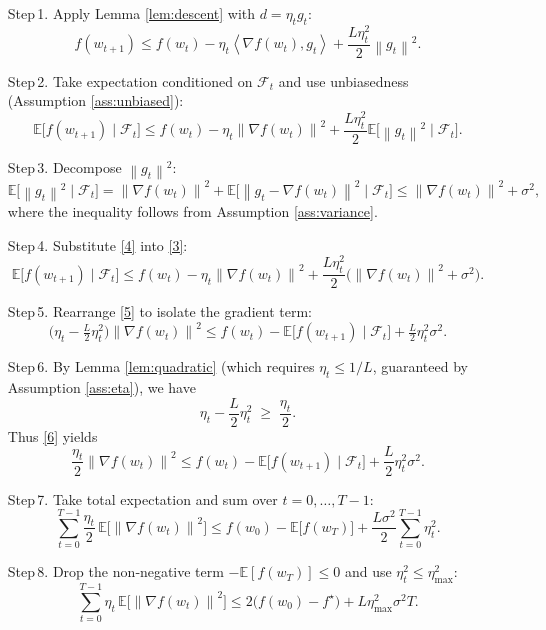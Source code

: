 \documentclass{article}
\newcommand{\EE}{\mathbb{E}}
\newcommand{\norm}[1]{\left\|#1\right\|}
\newcommand{\inner}[2]{\left\langle #1,#2\right\rangle}
\begin{document}
\begin{enumerate}
\item[Step 1.] Apply Lemma \ref{lem:descent} with $d=\eta_t g_t$:
\[
f(w_{t+1})\le f(w_t)-\eta_t\inner{\nabla f(w_t)}{g_t}
+\frac{L\eta_t^{2}}{2}\norm{g_t}^{2}.
\tag{2}
\]

\item[Step 2.] Take expectation conditioned on $\mathcal{F}_t$ and use unbiasedness (Assumption \ref{ass:unbiased}):
\[
\EE\!\bigl[f(w_{t+1})\mid\mathcal{F}_t\bigr]
\le f(w_t)-\eta_t\norm{\nabla f(w_t)}^{2}
+\frac{L\eta_t^{2}}{2}\EE\!\bigl[\norm{g_t}^{2}\mid\mathcal{F}_t\bigr].
\tag{3}
\]

\item[Step 3.] Decompose $\norm{g_t}^{2}$:
\[
\EE\!\bigl[\norm{g_t}^{2}\mid\mathcal{F}_t\bigr]
= \norm{\nabla f(w_t)}^{2}
+ \EE\!\bigl[\norm{g_t-\nabla f(w_t)}^{2}\mid\mathcal{F}_t\bigr]
\le \norm{\nabla f(w_t)}^{2}+\sigma^{2},
\tag{4}
\]
where the inequality follows from Assumption \ref{ass:variance}.

\item[Step 4.] Substitute \eqref{4} into \eqref{3}:
\[
\EE\!\bigl[f(w_{t+1})\mid\mathcal{F}_t\bigr]
\le f(w_t)-\eta_t\norm{\nabla f(w_t)}^{2}
+\frac{L\eta_t^{2}}{2}\bigl(\norm{\nabla f(w_t)}^{2}+\sigma^{2}\bigr).
\tag{5}
\]

\item[Step 5.] Rearrange \eqref{5} to isolate the gradient term:
\[
\bigl(\eta_t-\tfrac{L}{2}\eta_t^{2}\bigr)\norm{\nabla f(w_t)}^{2}
\le f(w_t)-\EE\!\bigl[f(w_{t+1})\mid\mathcal{F}_t\bigr]
+\tfrac{L}{2}\eta_t^{2}\sigma^{2}.
\tag{6}
\]

\item[Step 6.] %
By Lemma \ref{lem:quadratic} (which requires $\eta_t\le 1/L$, guaranteed by Assumption \ref{ass:eta}), we have
\[
\eta_t-\frac{L}{2}\eta_t^{2}\;\ge\;\frac{\eta_t}{2}.
\tag{7}
\]
Thus \eqref{6} yields
\[
\frac{\eta_t}{2}\norm{\nabla f(w_t)}^{2}
\le f(w_t)-\EE\!\bigl[f(w_{t+1})\mid\mathcal{F}_t\bigr]
+\frac{L}{2}\eta_t^{2}\sigma^{2}.
\tag{8}
\]

\item[Step 7.] %
Take total expectation and sum over $t=0,\dots,T-1$:
\[
\sum_{t=0}^{T-1}\frac{\eta_t}{2}\,\EE\!\bigl[\norm{\nabla f(w_t)}^{2}\bigr]
\le f(w_0)-\EE\!\bigl[f(w_T)\bigr]
+\frac{L\sigma^{2}}{2}\sum_{t=0}^{T-1}\eta_t^{2}.
\tag{9}
\]

\item[Step 8.] Drop the non‑negative term $-\EE[f(w_T)]\le0$ and use $\eta_t^{2}\le\eta_{\max}^{2}$:
\[
\sum_{t=0}^{T-1}\eta_t\,\EE\!\bigl[\norm{\nabla f(w_t)}^{2}\bigr]
\le
2\bigl(f(w_0)-f^{\star}\bigr)
+L\eta_{\max}^{2}\sigma^{2}T.
\tag{10}
\]


\end{enumerate}
\end{document}
